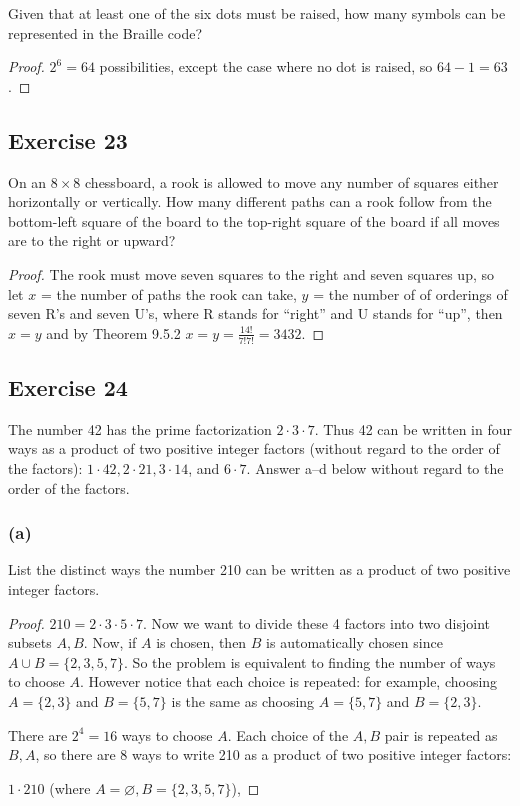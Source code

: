 \documentclass[14pt]{extarticle}
\newcommand{\es}{\varnothing}
\begin{document}
Given that at least one of the six dots must be raised, how many symbols can be represented in the Braille code?

\begin{proof}
     \(2^6 = 64\) possibilities, except the case where no dot is raised, so \(64-1=63\).
\end{proof}

\subsection{Exercise 23}
On an \(8 \times 8\) chessboard, a rook is allowed to move any number of squares either horizontally or vertically.
How many different paths can a rook follow from the bottom-left square of the board to the top-right square of the
board if all moves are to the right or upward?

\begin{proof}
     The rook must move seven squares to the right and seven squares up, so let \(x\) = the number of paths the rook can
     take, \(y\) =  the number of of orderings of seven R’s and seven U’s, where R stands for “right” and U stands for “up”,
     then \(x = y\) and by Theorem 9.5.2 \(x = y = \frac{14!}{7!7!} = 3432\).
\end{proof}

\subsection{Exercise 24}
The number 42 has the prime factorization \(2 \cdot 3 \cdot 7\). Thus 42 can be written in four ways as a product of
two positive integer factors (without regard to the order of the factors): \(1 \cdot 42, 2 \cdot 21, 3 \cdot 14\),
and \(6 \cdot 7\). Answer a–d below without regard to the order of the factors.

\subsubsection{(a)}
List the distinct ways the number 210 can be written as a product of two positive integer factors.

\begin{proof}
     \(210 = 2 \cdot 3 \cdot 5 \cdot 7\). Now we want to divide these 4 factors into two disjoint subsets \(A, B\). Now, if
     \(A\) is chosen, then \(B\) is automatically chosen since \(A \cup B = \{2,3,5,7\}\). So the problem is equivalent to
     finding the number of ways to choose \(A\). However notice that each choice is repeated: for example, choosing \(A = \{
     2,3\}\) and \(B = \{5,7\}\) is the same as choosing \(A = \{ 5,7\}\) and \(B = \{2,3\}\).

     There are \(2^4 = 16\) ways to choose \(A\). Each choice of the \(A,B\) pair is repeated as \(B,A\), so there are 8 ways
     to write 210 as a product of two positive integer factors:

     \(1 \cdot 210\) (where \(A = \es, B = \{2,3,5,7\}\)),
\end{proof}
\end{document}
